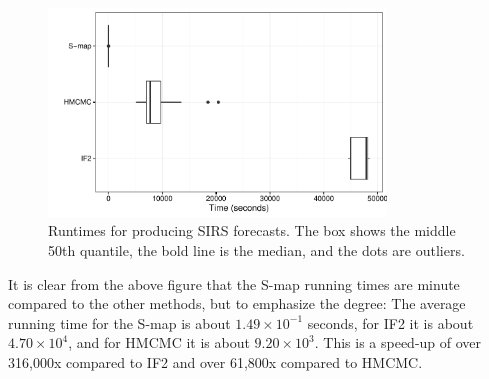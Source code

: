     \begin{figure}
        \centering
        \captionsetup{width=.8\linewidth}
        \includegraphics[width=0.8\textwidth]{./images/timeplot.pdf}
        \caption{Runtimes for producing SIRS forecasts. The box shows the middle 50th quantile, the bold line is the median, and the dots are outliers. \label{timeplot}}
    \end{figure}

    It is clear from the above figure that the S-map running times are minute compared to the other methods, but to emphasize the degree: The average running time for the S-map is about $1.49 \times 10^{-1}$ seconds, for IF2 it is about $4.70 \times 10^{4}$, and for HMCMC it is about $9.20 \times 10^{3}$. This is a speed-up of over 316,000x compared to IF2 and over 61,800x compared to HMCMC.
